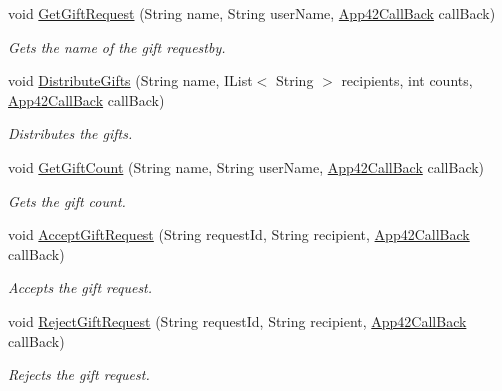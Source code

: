 \begin{DoxyCompactItemize}
void \hyperlink{classcom_1_1shephertz_1_1app42_1_1paas_1_1sdk_1_1csharp_1_1gift_1_1_gift_service_a078eda719317e6e0293bfe91a7f9f0ba}{Get\+Gift\+Request} (String name, String user\+Name, \hyperlink{interfacecom_1_1shephertz_1_1app42_1_1paas_1_1sdk_1_1csharp_1_1_app42_call_back}{App42\+Call\+Back} call\+Back)
\begin{DoxyCompactList}\small\item\em Gets the name of the gift requestby. \end{DoxyCompactList}\item 
void \hyperlink{classcom_1_1shephertz_1_1app42_1_1paas_1_1sdk_1_1csharp_1_1gift_1_1_gift_service_a7b080080b99466a2219f359bd9004534}{Distribute\+Gifts} (String name, I\+List$<$ String $>$ recipients, int counts, \hyperlink{interfacecom_1_1shephertz_1_1app42_1_1paas_1_1sdk_1_1csharp_1_1_app42_call_back}{App42\+Call\+Back} call\+Back)
\begin{DoxyCompactList}\small\item\em Distributes the gifts. \end{DoxyCompactList}\item 
void \hyperlink{classcom_1_1shephertz_1_1app42_1_1paas_1_1sdk_1_1csharp_1_1gift_1_1_gift_service_abbe1c6fad8f1f6ba863f18e43cbe0c70}{Get\+Gift\+Count} (String name, String user\+Name, \hyperlink{interfacecom_1_1shephertz_1_1app42_1_1paas_1_1sdk_1_1csharp_1_1_app42_call_back}{App42\+Call\+Back} call\+Back)
\begin{DoxyCompactList}\small\item\em Gets the gift count. \end{DoxyCompactList}\item 
void \hyperlink{classcom_1_1shephertz_1_1app42_1_1paas_1_1sdk_1_1csharp_1_1gift_1_1_gift_service_a0ed3cf2a6bd5061073b6057699986673}{Accept\+Gift\+Request} (String request\+Id, String recipient, \hyperlink{interfacecom_1_1shephertz_1_1app42_1_1paas_1_1sdk_1_1csharp_1_1_app42_call_back}{App42\+Call\+Back} call\+Back)
\begin{DoxyCompactList}\small\item\em Accepts the gift request. \end{DoxyCompactList}\item 
void \hyperlink{classcom_1_1shephertz_1_1app42_1_1paas_1_1sdk_1_1csharp_1_1gift_1_1_gift_service_a7a7639c14af41663e208d5b5d047dd9b}{Reject\+Gift\+Request} (String request\+Id, String recipient, \hyperlink{interfacecom_1_1shephertz_1_1app42_1_1paas_1_1sdk_1_1csharp_1_1_app42_call_back}{App42\+Call\+Back} call\+Back)
\begin{DoxyCompactList}\small\item\em Rejects the gift request. \end{DoxyCompactList}\item 

\end{DoxyCompactItemize}
